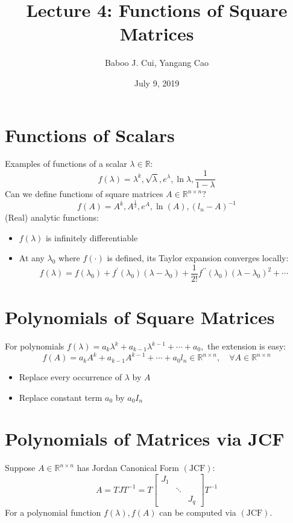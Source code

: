 \documentclass[10pt,a4paper,oneside]{article}
\date{July 9, 2019}
\author{Baboo J. Cui, Yangang Cao}
\title{Lecture 4: Functions of Square Matrices}
\begin{document}
\maketitle
\tableofcontents
\newpage
\section{Functions of Scalars}
Examples of functions of a scalar $\lambda \in \mathbb{R} :$
\[
f(\lambda)=\lambda^{k}, \sqrt{\lambda}, e^{\lambda}, \ln \lambda, \frac{1}{1-\lambda}
\]
Can we define functions of square matrices $A \in \mathbb{R}^{n \times n} ?$
\[
f(A)=A^{k}, A^{\frac{1}{2}}, e^{A}, \ln (A),\left(l_{n}-A\right)^{-1}
\]
(Real) analytic functions:
\begin{itemize}
\item $f(\lambda)$ is infinitely differentiable
\item At any $\lambda_{0}$ where $f(\cdot)$ is defined, its Taylor expansion converges locally:
\[
f(\lambda)=f\left(\lambda_{0}\right)+f^{\prime}\left(\lambda_{0}\right)\left(\lambda-\lambda_{0}\right)+\frac{1}{2 !} f^{\prime \prime}\left(\lambda_{0}\right)\left(\lambda-\lambda_{0}\right)^{2}+\cdots
\]
\end{itemize}
\section{Polynomials of Square Matrices}
For polynomials $f(\lambda)=a_{k} \lambda^{k}+a_{k-1} \lambda^{k-1}+\cdots+a_{0},$ the extension is easy:
\[
f(A)=a_{k} A^{k}+a_{k-1} A^{k-1}+\cdots+a_{0} l_{n} \in \mathbb{R}^{n \times n}, \quad \forall A \in \mathbb{R}^{n \times n}
\]
\begin{itemize}
\item Replace every occurrence of $\lambda$ by $A$
\item Replace constant term $a_0$ by $a_0I_n$
\end{itemize}
\section{Polynomials of Matrices via JCF}
Suppose $A \in \mathbb{R}^{n\times n}$ has Jordan Canonical Form $(\mathrm{JCF})$:
\[
A=T J T^{-1}=T\left[\begin{array}{lll}{J_{1}} & {} \\ {} & {\ddots} & {} \\ {} & {} & {J_{q}}\end{array}\right] T^{-1}
\]
For a polynomial function $f(\lambda), f(A)$ can be computed via $(\mathrm{JCF})$.
\end{document}

